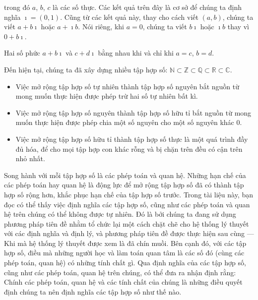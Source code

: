 trong đó $a$, $b$, $c$ là các số thực. Các kết quả trên đây là cơ sở để chúng ta định nghĩa $\imath = (0, 1)$. Cũng từ các kết quả này, thay cho cách viết $(a, b)$, chúng ta viết $a + b\imath$ hoặc $a + \imath b$. Nói riêng, khi $a = 0$, chúng ta viết $b\imath$ hoặc $\imath b$ thay vì $0 + b\imath$.

\begin{theorem}
	Hai số phức $a + b\imath$ và $c + d\imath$ bằng nhau khi và chỉ khi $a = c$, $b = d$.
\end{theorem}

Đến hiện tại, chúng ta đã xây dựng nhiều tập hợp số: $\mathbb{N} \subset \mathbb{Z} \subset \mathbb{Q} \subset \mathbb{R} \subset \mathbb{C}$.
\begin{itemize}
	\item Việc mở rộng tập hợp số tự nhiên thành tập hợp số nguyên bắt nguồn từ mong muốn thực hiện được phép trừ hai số tự nhiên bất kì.
	\item Việc mở rộng tập hợp số nguyên thành tập hợp số hữu tỉ bắt nguồn từ mong muốn thực hiện được phép chia một số nguyên cho một số nguyên khác $0$.
	\item Việc mở rộng tập hợp số hữu tỉ thành tập hợp số thực là một quá trình đầy đủ hóa, để cho mọi tập hợp con khác rỗng và bị chặn trên đều có cận trên nhỏ nhất.
\end{itemize}

Song hành với mỗi tập hợp số là các phép toán và quan hệ. Những hạn chế của các phép toán hay quan hệ là động lực để mở rộng tập hợp số đã có thành tập hợp số rộng hơn, khắc phục hạn chế của tập hợp số trước. Trong tài liệu này, bạn đọc có thể thấy việc định nghĩa các tập hợp số, cũng như các phép toán và quan hệ trên chúng có thể không được tự nhiên. Đó là bởi chúng ta đang sử dụng phương pháp tiên đề nhằm tổ chức lại một cách chặt chẽ cho hệ thống lý thuyết với các định nghĩa và định lý, và phương pháp tiên đề được thực hiện sau cùng --- Khi mà hệ thống lý thuyết được xem là đã chín muồi. Bên cạnh đó, với các tập hợp số, điều mà những người học và làm toán quan tâm là các số đó (cùng các phép toán, quan hệ) có những tính chất gì. Qua định nghĩa của các tập hợp số, cũng như các phép toán, quan hệ trên chúng, có thể đưa ra nhận định rằng: Chính các phép toán, quan hệ và các tính chất của chúng là những điều quyết định chúng ta nên định nghĩa các tập hợp số như thế nào.

